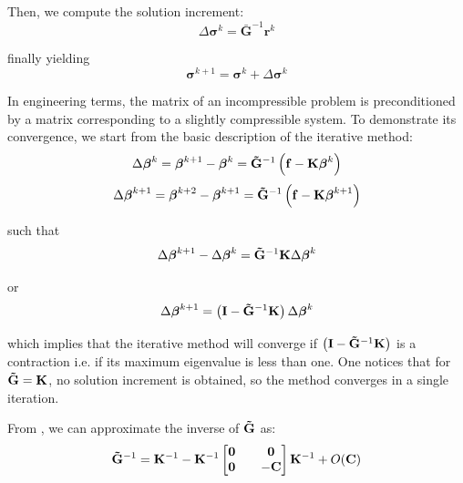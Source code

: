 \documentclass{wccm2024}
\begin{document}
\noindent Then, we compute the solution increment:
\vskip -0.3cm
\begin{equation}
    \Delta\boldsymbol{\sigma}^k = \mathbf{\bar{G}}^{-1} \mathbf{r}^{k}
\end{equation}

\noindent finally yielding
\vskip -0.3cm
\begin{equation}
    \boldsymbol{\sigma}^{k+1} = \boldsymbol{\sigma}^{k} + \Delta\boldsymbol{\sigma}^k
\end{equation}

In engineering terms, the matrix of an incompressible problem is preconditioned by a matrix corresponding to a slightly compressible system. To demonstrate its convergence, we start from the basic description of the iterative method:
\vskip -0.3cm
\begin{equation}
    \Delta\boldsymbol{\beta}^{k} = \boldsymbol{\beta}^{k+1} - \boldsymbol{\beta}^{k} = \mathbf{\Tilde{G}}^{-1} \left( \mathbf{f} - \mathbf{K} \boldsymbol{\beta}^k \right)
\end{equation}
\vskip -0.3cm
\begin{equation}
    \Delta\boldsymbol{\beta}^{k+1} = \boldsymbol{\beta}^{k+2} - \boldsymbol{\beta}^{k+1} = \mathbf{\Tilde{G}}^{-1} \left( \mathbf{f} - \mathbf{K} \boldsymbol{\beta}^{k+1} \right)
\end{equation}

\noindent such that
\vskip -0.3cm
\begin{equation}
    \Delta\boldsymbol{\beta}^{k+1} - \Delta\boldsymbol{\beta}^{k} = \mathbf{\Tilde{G}}^{-1} \mathbf{K} \Delta\boldsymbol{\beta}^{k}
\end{equation}

\noindent or
\vskip -0.3cm
\begin{equation}
    \Delta\boldsymbol{\beta}^{k+1} = \left( \mathbf{I} - \mathbf{\Tilde{G}}^{-1} \mathbf{K} \right) \Delta\boldsymbol{\beta}^{k}
\end{equation}

\noindent which implies that the iterative method will converge if $\left( \mathbf{I} - \mathbf{\Tilde{G}}^{-1} \mathbf{K} \right)$ is a contraction i.e. if its maximum eigenvalue is less than one. One notices that for $\mathbf{\Tilde{G}} = \mathbf{K}$, no solution increment is obtained, so the method converges in a single iteration.

From \cite{gurtin1982introduction}, we can approximate the inverse of $\mathbf{\Tilde{G}}$ as:
\vskip -0.3cm
\begin{equation}
    \mathbf{\Tilde{G}}^{-1} = \mathbf{K}^{-1}-\mathbf{K}^{-1}
    \begin{bmatrix}
        \mathbf{0} && \mathbf{0} \\
        \mathbf{0} && -\mathbf{C}
    \end{bmatrix}
    \mathbf{K}^{-1} + O(\mathbf{C})
\end{equation}
\end{document}
